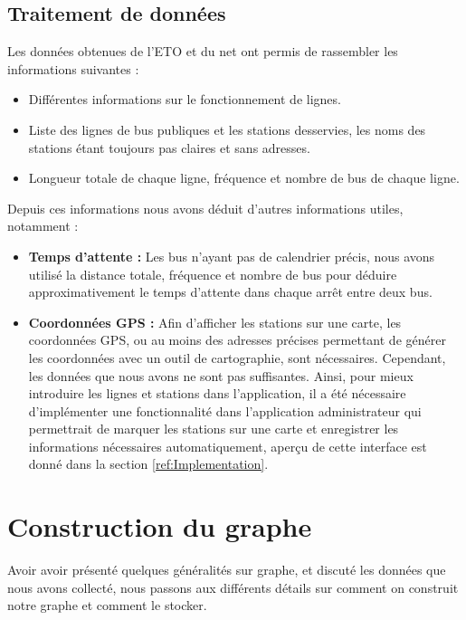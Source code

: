 \subsection{Traitement de données}
Les données obtenues de l'ETO et du net ont permis de rassembler les informations suivantes :
\begin{itemize}
	\item Différentes informations sur le fonctionnement de lignes.
	\item Liste des lignes de bus publiques et les stations desservies, les noms des stations étant toujours pas claires et sans adresses.
	\item Longueur totale de chaque ligne, fréquence et nombre de bus de chaque ligne.\newline 
\end{itemize}

Depuis ces informations nous avons déduit d'autres informations utiles, notamment :

\begin{itemize}
	\item \textbf{Temps d'attente : } Les bus n'ayant pas de calendrier précis, nous avons utilisé la distance totale, fréquence et nombre de bus pour déduire approximativement le temps d'attente dans chaque arrêt entre deux bus.
	\item \textbf{Coordonnées GPS :} Afin d'afficher les stations sur une carte, les coordonnées GPS, ou au moins des adresses précises permettant de générer les coordonnées avec un outil de cartographie, sont nécessaires. Cependant, les données que nous avons ne sont pas suffisantes. 
	Ainsi, pour mieux introduire les lignes et stations dans l'application, il a été nécessaire d'implémenter une fonctionnalité dans l'application administrateur qui permettrait de marquer les stations sur une carte et enregistrer les informations nécessaires automatiquement, aperçu de cette interface est donné dans la section \ref{ref:Implementation}.
\end{itemize}

	
\section{Construction du graphe}
Avoir avoir présenté quelques généralités sur graphe, et discuté les données que nous avons collecté, nous passons aux différents détails sur comment on construit notre graphe et comment le stocker.
